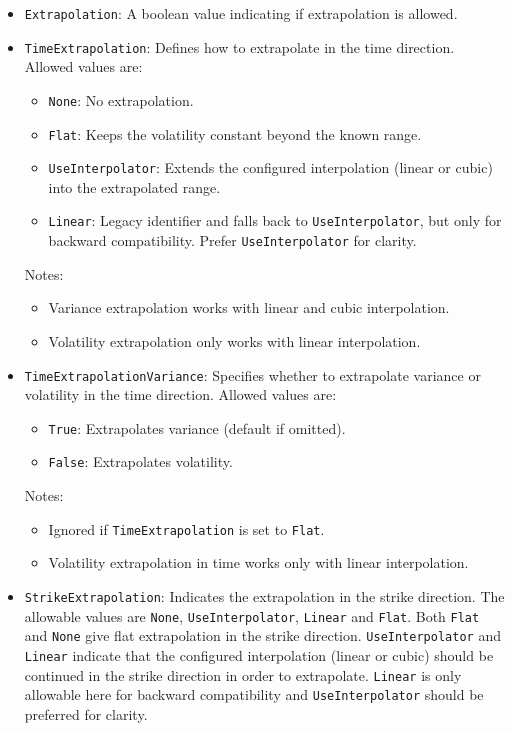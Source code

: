 \begin{itemize}
\item \lstinline!Extrapolation!:
A boolean value indicating if extrapolation is allowed.

\item \lstinline!TimeExtrapolation!:
Defines how to extrapolate in the time direction. Allowed values are:
  \begin{itemize}
    \item \lstinline!None!: No extrapolation.
    \item \lstinline!Flat!: Keeps the volatility constant beyond the known range.
    \item \lstinline!UseInterpolator!: Extends the configured interpolation (linear or cubic) into the extrapolated range.
    \item \lstinline!Linear!: Legacy identifier and falls back to \lstinline!UseInterpolator!, but only for backward compatibility. Prefer \lstinline!UseInterpolator! for clarity.
  \end{itemize}
  Notes:
  \begin{itemize}
    \item Variance extrapolation works with linear and cubic interpolation.
    \item Volatility extrapolation only works with linear interpolation.
  \end{itemize}

\item \lstinline!TimeExtrapolationVariance!:
Specifies whether to extrapolate variance or volatility in the time direction. Allowed values are:
  \begin{itemize}
    \item \lstinline!True!: Extrapolates variance (default if omitted).
    \item \lstinline!False!: Extrapolates volatility.
  \end{itemize}
  Notes:
  \begin{itemize}
    \item Ignored if \lstinline!TimeExtrapolation! is set to \lstinline!Flat!.
    \item Volatility extrapolation in time works only with linear interpolation.
  \end{itemize}
\item \lstinline!StrikeExtrapolation!:
Indicates the extrapolation in the strike direction. The allowable values are \lstinline!None!, \lstinline!UseInterpolator!, \lstinline!Linear! and \lstinline!Flat!. Both \lstinline!Flat! and \lstinline!None! give flat extrapolation in the strike direction. \lstinline!UseInterpolator! and \lstinline!Linear! indicate that the configured interpolation (linear or cubic) should be continued in the strike direction in order to extrapolate. \lstinline!Linear! is only allowable here for backward compatibility and \lstinline!UseInterpolator! should be preferred for clarity.


\end{itemize}
